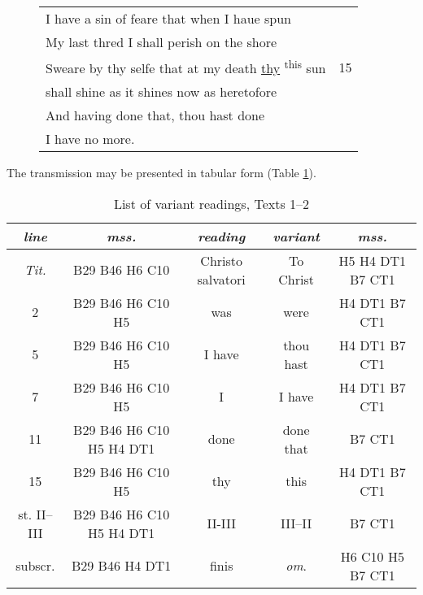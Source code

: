 \begin{paper}
\begin{figure}[H]
\begin{tabular}{lc}
    I have a sin of feare that when I haue spun & \\
    My last thred I shall perish on the shore & \\
    Sweare by thy selfe that at my death \underline{thy} \textsuperscript{this} sun & 15 \\
    shall shine as it shines now as heretofore & \\
    And having done that, thou hast done & \\ 
    \-\hspace{2cm}I have no more.
    \end{tabular}
    \caption*{}
    \label{fig:lappin:christo}
\end{figure}


The transmission may be presented in tabular form (Table \ref{tab:lappin:1}).

\begin{table}[H]
    \centering\scriptsize\renewcommand{\arraystretch}{1.5}
    \caption{List of variant readings, Texts 1–2}
    \label{tab:lappin:1}
    \begin{tabular}{c|c|c|c|c}
    \toprule
    \emph{line} & \emph{mss.} & \emph{reading} & \emph{variant} &
    \emph{mss.}\\
    \midrule
    \emph{Tit.} & B29 B46 H6 C10 & Christo salvatori & To Christ & H5 H4 DT1
    B7 CT1\tabularnewline
    2 & B29 B46 H6 C10 H5 & was & were & H4 DT1 B7 CT1\tabularnewline
    5 & B29 B46 H6 C10 H5 & I have & thou hast & H4 DT1 B7
    CT1\tabularnewline
    7 & B29 B46 H6 C10 H5 & I & I have & H4 DT1 B7 CT1\tabularnewline
    11 & B29 B46 H6 C10 H5 H4 DT1 & done & done that & B7 CT1\tabularnewline
    15 & B29 B46 H6 C10 H5 & thy & this & H4 DT1 B7 CT1\tabularnewline
    st. II--III & B29 B46 H6 C10 H5 H4 DT1 & II-III & III--II & B7
    CT1\tabularnewline
    subscr. & B29 B46 H4 DT1 & finis & \emph{om}. & H6 C10 H5 B7
    CT1\\
    \bottomrule
    \end{tabular}
\end{table}


\end{paper}
